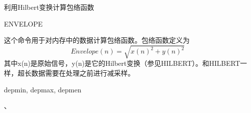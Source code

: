 \label{cmd:envelope}

利用Hilbert变换计算包络函数

\begin{SACSTX}
ENVELOPE
\end{SACSTX}

这个命令用于对内存中的数据计算包络函数。包络函数定义为
	\[ Envelope(n)= \sqrt{x(n)^2+y(n)^2} \]
其中x(n)是原始信号，y(n)是它的Hilbert变换（参见HILBERT）。和HILBERT一样，超长数据需要在处理之前进行减采样。

depmin, depmax, depmen

、
